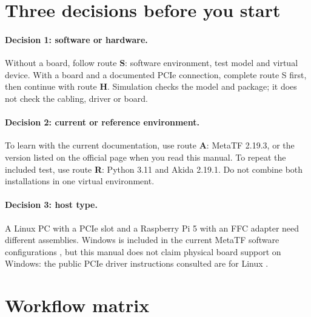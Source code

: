 \section{Three decisions before you start}

\paragraph{Decision 1: software or hardware.}
Without a board, follow route \textbf{S}: software environment, test model and virtual
device. With a board and a documented PCIe connection, complete route S first, then
continue with route \textbf{H}. Simulation checks the model and package; it does not
check the cabling, driver or board.


\paragraph{Decision 2: current or reference environment.}
To learn with the current documentation, use route \textbf{A}: MetaTF 2.19.3, or the
version listed on the official page when you read this manual. To repeat the included
test, use route \textbf{R}: Python 3.11 and Akida 2.19.1. Do not combine both installations in one virtual environment.


\paragraph{Decision 3: host type.}
A Linux PC with a PCIe slot and a Raspberry Pi 5 with an FFC adapter need different
assemblies. Windows is included in the current MetaTF software configurations
\cite{brainchip_install_2193}, but this manual does not claim physical board support
on Windows: the public PCIe driver instructions consulted are for Linux
\cite{brainchip_driver}.


\section{Workflow matrix}

